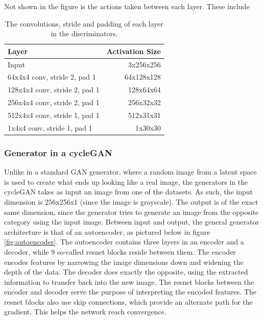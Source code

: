 \documentclass[12pt, fleqn, titlepage]{article}
\begin{document}
Not shown in the figure is the actions taken between each layer. These include 

\begin{table}[H]\label{discriminator_layers}
	\centering
	\begin{tabular}{lr}\toprule
		Layer                         & Activation Size \\ \midrule
		Input                         & 3x256x256       \\
		64x4x4 conv, stride 2, pad 1  & 64x128x128      \\
		128x4x4 conv, stride 2, pad 1 & 128x64x64       \\
		256x4x4 conv, stride 2, pad 1 & 256x32x32       \\
		512x4x4 conv, stride 1, pad 1 & 512x31x31       \\
		1x4x4 conv, stride 1, pad 1   & 1x30x30         \\ \bottomrule
	\end{tabular}
	\caption{The convolutions, stride and padding of each layer in the discriminators.}
\end{table}


\subsubsection{Generator in a cycleGAN}
Unlike in a standard GAN generator, where a random image from a latent space is used to create what ends up looking like a real image, the generators in the cycleGAN takes as input an image from one of the datasets. As such, the input dimension is 256x256x1 (since the image is grayscale). The output is of the exact same dimension, since the generator tries to generate an image from the opposite category using the input image. Between input and output, the general generator architecture is that of an autoencoder, as pictured below in figure \ref{fig:autoencoder}. The autoencoder contains three layers in an encoder and a decoder, while 9 so-called resnet blocks reside between them. The encoder encodes features by narrowing the image dimensions down and widening the depth of the data. The decoder does exactly the opposite, using the extracted information to transfer back into the new image. The resnet blocks between the encoder and decoder serve the purpose of interpreting the encoded features. The resnet blocks also use skip connections, which provide an alternate path for the gradient. This helps the network reach convergence.
\end{document}
